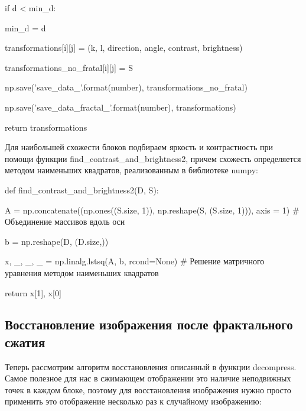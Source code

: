 \documentclass{article}
\begin{document}
{\hspace{4cm}				if d < min\_d:

\hspace{5cm}					min\_d = d

\hspace{5cm}					transformations[i][j] = (k, l, direction, angle, contrast, brightness)

\hspace{5cm}					transformations\_no\_fratal[i][j] = S

\hspace{1cm}	np.save('save\_data\_{}'.format(number), transformations\_no\_fratal)

\hspace{1cm}	np.save('save\_data\_fractal\_{}'.format(number), transformations)

\hspace{1cm}	return transformations
}
\vspace{1em}

Для наибольшей схожести блоков подбираем яркость и контрастность при помощи функции find\_contrast\_and\_brightness2, причем схожесть определяется методом наименьших квадратов, реализованным в библиотеке numpy:
{
def find\_contrast\_and\_brightness2(D, S):

\hspace{1cm}	A = np.concatenate((np.ones((S.size, 1)), np.reshape(S, (S.size, 1))), axis = 1) \# Объединение массивов вдоль оси

\hspace{1cm}	b = np.reshape(D, (D.size,))

\hspace{1cm}	x, \_, \_, \_ = np.linalg.lstsq(A, b, rcond=None) \# Решение матричного уравнения методом наименьших квадратов

\hspace{1cm}	return x[1], x[0]
}

\vspace{1em}

\subsection{Восстановление изображения после фрактального сжатия}

Теперь рассмотрим алгоритм восстановления описанный в функции decompress. Самое полезное для нас в сжимающем отображении это наличие неподвижных точек в каждом блоке, поэтому для восстановления изображения 
нужно просто применить это отображение несколько раз к случайному изображению:
\end{document}
